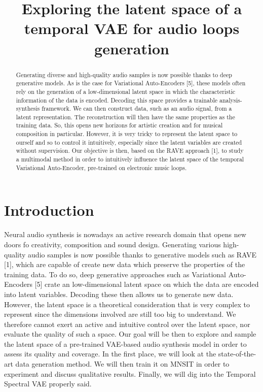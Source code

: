 \documentclass{article}
\title{Exploring the latent space of a temporal VAE for audio loops generation}
\date{}
\begin{document}
\maketitle
\vfill
\hspace*{-3cm}\hspace*{1cm}


\begin{abstract}
    Generating diverse and high-quality audio samples is now possible thanks to deep generative models. As is the case for Variational Auto-Encoders [5], these models often rely on the generation of a low-dimensional latent space in which the characteristic information of the data is encoded. Decoding this space provides a trainable analysis-synthesis framework. We can then construct data, such as an audio signal, from a latent representation. The reconstruction will then have the same properties as the training data. So, this opens new horizons for artistic creation and for musical composition in particular. However, it is very tricky to represent the latent space to ourself and so to control it intuitively, especially since the latent variables are created without supervision. Our objective is then, based on the RAVE approach [1], to study a multimodal method in order to intuitively influence the latent space of the temporal Variational Auto-Encoder, pre-trained on electronic music loops.

\end{abstract}

\section{Introduction}

Neural audio synthesis is nowadays an active research domain that opens new doors fo creativity, composition and sound design. Generating various high-quality audio samples is now possible thanks to generative models such as RAVE [1], which are capable of create new data which preserve the properties of the training data. To do so, deep generative approaches such as Variational Auto-Encoders [5] crate an low-dimensional latent space on which the data are encoded into latent variables. Decoding these then allows us to generate new data. However, the latent space is a theoretical consideration that is very complex to represent since the dimensions involved are still too big to understand. We therefore cannot exert an active and intuitive control over the latent space, nor evaluate the quality of such a space. Our goal will be then to explore and sample the latent space of a pre-trained VAE-based audio synthesis model in order to assess its quality and coverage. In the first place, we will look at the state-of-the-art data generation method. We will then train it on MNSIT in order to experiment and discuss qualitative results. Finally, we will dig into the Temporal Spectral VAE properly said.
\end{document}
